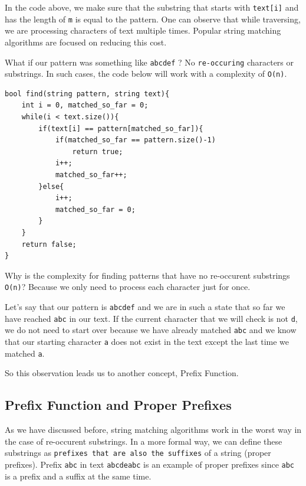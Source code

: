 \documentclass[12pt]{article}
\begin{document}
        In the code above, we make sure that the substring that starts with \texttt{text[i]} and has the length of \texttt{m} is equal to the pattern. One can observe that while traversing, we are processing characters of text multiple times. Popular string matching algorithms are focused on reducing this cost.
        
        What if our pattern was something like \texttt{abcdef} ? No \texttt{re-occuring} characters or substrings. In such cases, the code below will work with a complexity of \texttt{O(n)}.
        
        \begin{verbatim}
bool find(string pattern, string text){
    int i = 0, matched_so_far = 0;
    while(i < text.size()){
        if(text[i] == pattern[matched_so_far]){
            if(matched_so_far == pattern.size()-1)
                return true;
            i++;
            matched_so_far++;
        }else{
            i++;
            matched_so_far = 0;
        }
    }
    return false;
}
        \end{verbatim}
        
        Why is the complexity for finding patterns that have no re-occurent substrings \texttt{O(n)}? Because we only need to process each character just for once.
        
        Let's say that our pattern is \texttt{abcdef} and we are in such a state that so far we have reached \texttt{abc} in our text. If the current character that we will check is not \texttt{d}, we do not need to start over because we have already matched \texttt{abc} and we know that our starting character \texttt{a} does not exist in the text except the last time we matched \texttt{a}.
        
        So this observation leads us to another concept, Prefix Function.
        
        \subsection{Prefix Function and Proper Prefixes}
        
        As we have discussed before, string matching algorithms work in the worst way in the case of re-occurent substrings. In a more formal way, we can define these substrings as \texttt{prefixes that are also the suffixes} of a string (proper prefixes). Prefix \texttt{abc} in text \texttt{abcdeabc} is an example of proper prefixes since \texttt{abc} is a prefix and a suffix at the same time. 
        
\end{document}
